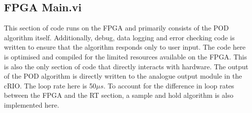 \documentclass[conference]{IEEEtran}
\begin{document}
\subsection{FPGA Main.vi}
This section of code runs on the FPGA and primarily consists of the POD algorithm itself. Additionally, debug, data logging and error checking code is written to ensure that the algorithm responds only to user input. The code here is optimised and compiled for the limited resources available on the FPGA. This is also the only section of code that directly interacts with hardware. The output of the POD algorithm is directly written to the analogue output module in the cRIO. The loop rate here is 50$\mu s$. To account for the difference in loop rates between the FPGA and the RT section, a sample and hold algorithm is also implemented here.
\end{document}

